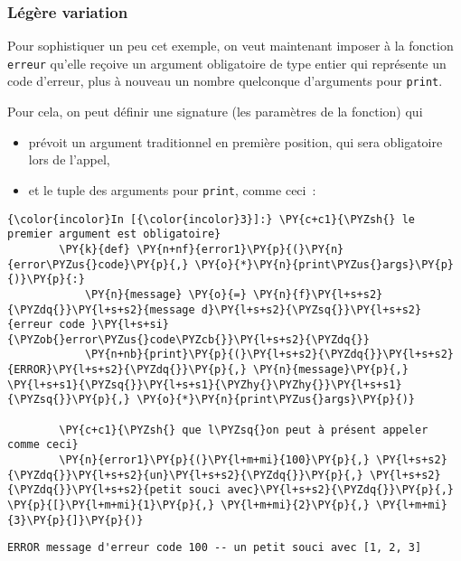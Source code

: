     \hypertarget{luxe9guxe8re-variation}{%
\subsubsection{Légère variation}\label{luxe9guxe8re-variation}}

    Pour sophistiquer un peu cet exemple, on veut maintenant imposer à la
fonction \texttt{erreur} qu'elle reçoive un argument obligatoire de type
entier qui représente un code d'erreur, plus à nouveau un nombre
quelconque d'arguments pour \texttt{print}.

Pour cela, on peut définir une signature (les paramètres de la fonction)
qui

\begin{itemize}
\tightlist
\item
  prévoit un argument traditionnel en première position, qui sera
  obligatoire lors de l'appel,
\item
  et le tuple des arguments pour \texttt{print}, comme ceci~:
\end{itemize}

    \begin{Verbatim}[commandchars=\\\{\}]
{\color{incolor}In [{\color{incolor}3}]:} \PY{c+c1}{\PYZsh{} le premier argument est obligatoire}
        \PY{k}{def} \PY{n+nf}{error1}\PY{p}{(}\PY{n}{error\PYZus{}code}\PY{p}{,} \PY{o}{*}\PY{n}{print\PYZus{}args}\PY{p}{)}\PY{p}{:}
            \PY{n}{message} \PY{o}{=} \PY{n}{f}\PY{l+s+s2}{\PYZdq{}}\PY{l+s+s2}{message d}\PY{l+s+s2}{\PYZsq{}}\PY{l+s+s2}{erreur code }\PY{l+s+si}{\PYZob{}error\PYZus{}code\PYZcb{}}\PY{l+s+s2}{\PYZdq{}}
            \PY{n+nb}{print}\PY{p}{(}\PY{l+s+s2}{\PYZdq{}}\PY{l+s+s2}{ERROR}\PY{l+s+s2}{\PYZdq{}}\PY{p}{,} \PY{n}{message}\PY{p}{,} \PY{l+s+s1}{\PYZsq{}}\PY{l+s+s1}{\PYZhy{}\PYZhy{}}\PY{l+s+s1}{\PYZsq{}}\PY{p}{,} \PY{o}{*}\PY{n}{print\PYZus{}args}\PY{p}{)}
            
        \PY{c+c1}{\PYZsh{} que l\PYZsq{}on peut à présent appeler comme ceci}
        \PY{n}{error1}\PY{p}{(}\PY{l+m+mi}{100}\PY{p}{,} \PY{l+s+s2}{\PYZdq{}}\PY{l+s+s2}{un}\PY{l+s+s2}{\PYZdq{}}\PY{p}{,} \PY{l+s+s2}{\PYZdq{}}\PY{l+s+s2}{petit souci avec}\PY{l+s+s2}{\PYZdq{}}\PY{p}{,} \PY{p}{[}\PY{l+m+mi}{1}\PY{p}{,} \PY{l+m+mi}{2}\PY{p}{,} \PY{l+m+mi}{3}\PY{p}{]}\PY{p}{)}
\end{Verbatim}


    \begin{Verbatim}[commandchars=\\\{\}]
ERROR message d'erreur code 100 -- un petit souci avec [1, 2, 3]

    \end{Verbatim}

